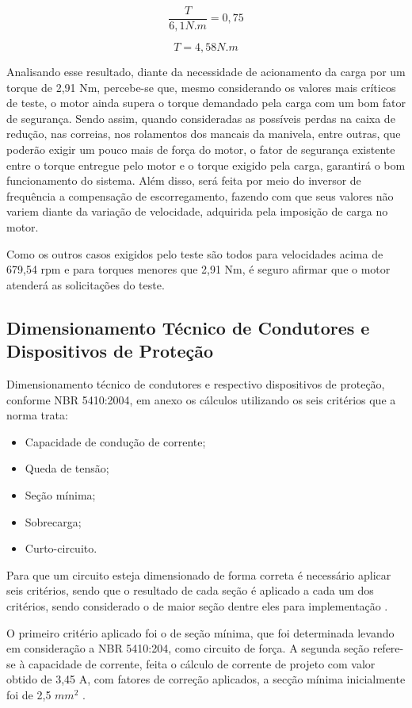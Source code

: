 	$$ \frac{T}{6,1 N.m} = 0,75 $$

	$$ T = 4,58 N.m $$

	Analisando esse resultado, diante da necessidade de acionamento da carga por um torque de 2,91 Nm, percebe-se que, mesmo considerando os valores mais críticos de teste, o motor ainda supera o torque demandado pela carga com um bom fator de segurança. Sendo assim, quando consideradas as possíveis perdas na caixa de redução, nas correias, nos rolamentos dos mancais da manivela, entre outras, que poderão exigir um pouco mais de força do motor, o fator de segurança existente entre o torque entregue pelo motor e o torque exigido pela carga, garantirá o bom funcionamento do sistema. Além disso, será feita por meio do inversor de frequência a compensação de escorregamento, fazendo com que seus valores não variem diante da variação de velocidade, adquirida pela imposição de carga no motor.

	Como os outros casos exigidos pelo teste são todos para velocidades acima de 679,54 rpm e para torques menores que 2,91 Nm, é seguro afirmar que o motor atenderá as solicitações do teste.


\subsection{Dimensionamento Técnico de Condutores e Dispositivos de Proteção}
	
	Dimensionamento técnico de condutores e respectivo dispositivos de proteção, conforme NBR 5410:2004, em anexo os cálculos utilizando os seis critérios que a norma trata:

	\begin{itemize}
		\item Capacidade de condução de corrente;
		\item Queda de tensão;
		\item Seção mínima;
		\item Sobrecarga;
		\item Curto-circuito.
	\end{itemize}

	Para que um circuito esteja dimensionado de forma correta é necessário aplicar seis critérios, sendo que o resultado de cada seção é aplicado a cada um dos critérios, sendo considerado o de maior seção dentre eles para implementação \cite{NBR5410}.
	
	O primeiro critério aplicado foi o de seção mínima, que foi determinada levando em consideração a NBR 5410:204, como circuito de força. A segunda seção refere-se à capacidade de corrente, feita o cálculo de corrente de projeto com valor obtido de 3,45 A, com fatores de correção aplicados, a secção mínima inicialmente foi de 2,5 $mm^{2}$ \cite{NBR5410}.
	
